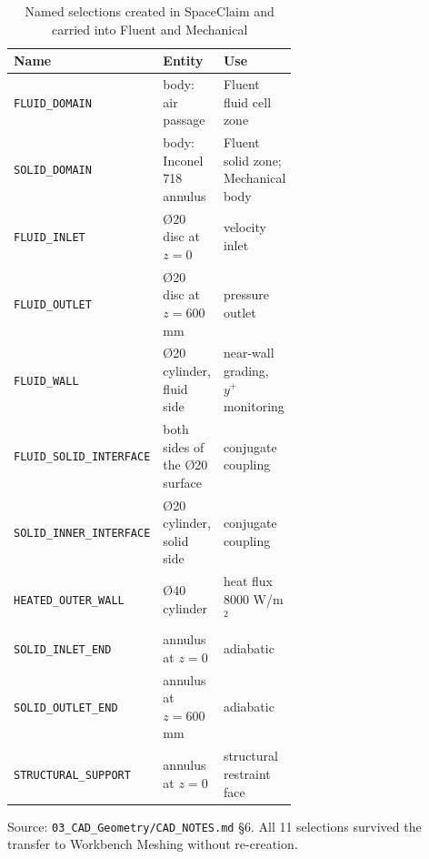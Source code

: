 \begin{table}[htbp]
\centering
\footnotesize
\caption{Named selections created in SpaceClaim and carried into Fluent and Mechanical}
\label{tab:namedsel}
\begin{tabular}{l>{\raggedright\arraybackslash}p{0.30\linewidth}>{\raggedright\arraybackslash}p{0.32\linewidth}}
\toprule
Name & Entity & Use \\
\midrule
\texttt{FLUID\_DOMAIN} & body: air passage & Fluent fluid cell zone \\
\texttt{SOLID\_DOMAIN} & body: Inconel 718 annulus & Fluent solid zone; Mechanical body \\
\texttt{FLUID\_INLET} & \O{}20 disc at $z = 0$ & velocity inlet \\
\texttt{FLUID\_OUTLET} & \O{}20 disc at $z = 600$ mm & pressure outlet \\
\texttt{FLUID\_WALL} & \O{}20 cylinder, fluid side & near-wall grading, $y^+$ monitoring \\
\texttt{FLUID\_SOLID\_INTERFACE} & both sides of the \O{}20 surface & conjugate coupling \\
\texttt{SOLID\_INNER\_INTERFACE} & \O{}20 cylinder, solid side & conjugate coupling \\
\texttt{HEATED\_OUTER\_WALL} & \O{}40 cylinder & heat flux 8000 W/m$^2$ \\
\texttt{SOLID\_INLET\_END} & annulus at $z = 0$ & adiabatic \\
\texttt{SOLID\_OUTLET\_END} & annulus at $z = 600$ mm & adiabatic \\
\texttt{STRUCTURAL\_SUPPORT} & annulus at $z = 0$ & structural restraint face \\
\bottomrule
\end{tabular}
\par\smallskip\parbox{\linewidth}{\footnotesize\raggedright Source: \texttt{03\_CAD\_Geometry/CAD\_NOTES.md} \S6. All 11 selections survived the transfer to Workbench Meshing without re-creation.}
\end{table}
